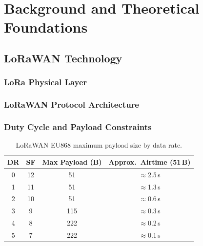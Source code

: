 \documentclass[12pt, a4paper, twoside, openright]{report}
\begin{document}
\chapter{Background and Theoretical Foundations}
\label{ch:background}

\section{LoRaWAN Technology}
\label{sec:lorawan-tech}

\subsection{LoRa Physical Layer}

\subsection{LoRaWAN Protocol Architecture}

\subsection{Duty Cycle and Payload Constraints}
\begin{table}[H]
  \centering
  \begin{tabular}{cccc}
    \toprule
    \textbf{DR} & \textbf{SF} & \textbf{Max Payload (B)} & \textbf{Approx.\ Airtime (51\,B)} \\
    \midrule
    0 & 12 & 51  & $\approx$2.5\,s \\
    1 & 11 & 51  & $\approx$1.3\,s \\
    2 & 10 & 51  & $\approx$0.6\,s \\
    3 & 9  & 115 & $\approx$0.3\,s \\
    4 & 8  & 222 & $\approx$0.2\,s \\
    5 & 7  & 222 & $\approx$0.1\,s \\
    \bottomrule
  \end{tabular}
  \caption{LoRaWAN EU868 maximum payload size by data rate.}
  \label{tab:lorawan-payload}
\end{table}
\end{document}
